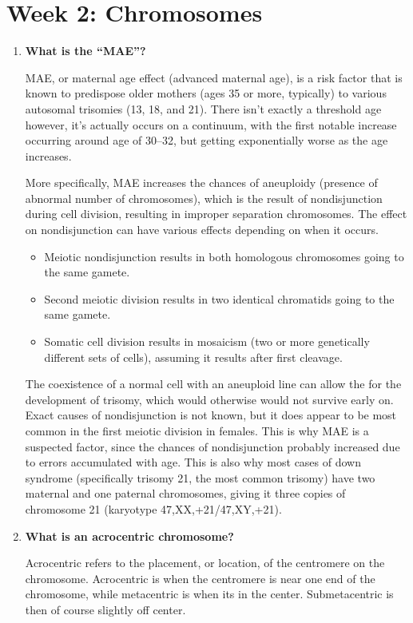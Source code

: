 \documentclass[plain,basic]{inVerba-notes}
\begin{document}
  \section{Week 2: Chromosomes}
  \begin{enumerate}
    \item \textbf{What is the ``MAE''?}
    
    MAE, or maternal age effect (advanced maternal age), is a risk factor that is known to predispose older mothers (ages 35 or more, typically) to various autosomal trisomies (13, 18, and 21). There isn't exactly a threshold age however, it's actually occurs on a continuum, with the first notable increase occurring around age of 30--32, but getting exponentially worse as the age increases.

    More specifically, MAE increases the chances of aneuploidy (presence of abnormal number of chromosomes), which is the result of nondisjunction during cell division, resulting in improper separation chromosomes. The effect on nondisjunction can have various effects depending on when it occurs. 
      \begin{itemize}
        \item Meiotic nondisjunction results in both homologous chromosomes going to the same gamete.
        \item Second meiotic division results in two identical chromatids going to the same gamete.
        \item Somatic cell division results in mosaicism (two or more genetically different sets of cells), assuming it results after first cleavage.
      \end{itemize}

    The coexistence of a normal cell with an aneuploid line can allow the for the development of trisomy, which would otherwise would not survive early on. Exact causes of nondisjunction is not known, but it does appear to be most common in the first meiotic division in females. This is why MAE is a suspected factor, since the chances of nondisjunction probably increased due to errors accumulated with age. This is also why most cases of down syndrome (specifically trisomy 21, the most common trisomy) have two maternal and one paternal chromosomes, giving it three copies of chromosome 21 (karyotype 47,XX,+21/47,XY,+21).

    \item \textbf{What is an acrocentric chromosome?}
    
    Acrocentric refers to the placement, or location, of the centromere on the chromosome. Acrocentric is when the centromere is near one end of the chromosome, while metacentric is when its in the center. Submetacentric is then of course slightly off center.


\end{enumerate}
\end{document}
